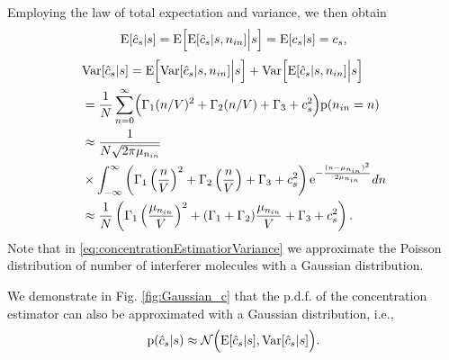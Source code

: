 \documentclass[twocolumn]{IEEEtran}
\newcommand{\p}{\mathrm{p}}
\newcommand{\E}{\mathrm{E}}
\newcommand{\e}{\mathrm{e}}
\newcommand{\Var}{\mathrm{Var}}
\begin{document}
Employing the law of total expectation and variance, we then obtain
\begin{align}
\E[\hat{c}_s|s] = \E\Bigl[\E[\hat{c}_s|s, n_{in}]\Big|s\Bigr] = \E[c_s|s] = c_s,
\end{align}
\begin{align} \label{eq:concentrationEstimatiorVariance}
&\Var[\hat{c}_s|s] = \E\Bigl[\Var[\hat{c}_s|s, n_{in}]\Big|s\Bigr] + \Var\Bigl[\E[\hat{c}_s|s, n_{in}]\Big|s\Bigr] \\ \nonumber
&= \frac{1}{N} \sum_{n=0}^\infty \Bigl(\Gamma_1 (n/V)^2 + \Gamma_2 (n/V) + \Gamma_3 + c_s^2 \Bigr) \p(n_{in} = n) \\ \nonumber
&\approx  \frac{1}{N \sqrt{2 \pi \mu_{n_{in}}}}  \\ \nonumber
&\times \int_{-\infty}^\infty \left(\Gamma_1 \left(\frac{n}{V}\right)^2+ \Gamma_2 \left(\frac{n}{V}\right) + \Gamma_3 + c_s^2\right) \e^{ -\frac{(n-\mu_{n_{in}})^2}{2\mu_{n_{in}}}} dn\\ \nonumber
&\approx \frac{1}{N} \left(\Gamma_1 \left(\frac{\mu_{n_{in}}}{V}\right)^2 + (\Gamma_1 + \Gamma_2) \frac{\mu_{n_{in}}}{V} + \Gamma_3 + c_s^2 \right).
\end{align}
Note that in \eqref{eq:concentrationEstimatiorVariance} we approximate the Poisson distribution of number of interferer molecules with a Gaussian distribution. 

We demonstrate in Fig. \ref{fig:Gaussian_c} that the p.d.f. of the concentration estimator can also be approximated with a Gaussian distribution, i.e.,
\begin{equation}
\p(\hat{c}_s|s) \approx \mathcal{N}\Bigl(\E[\hat{c}_s|s] , \Var[\hat{c}_s|s] \Bigr). \label{eq:DRUBTpdf} 
\end{equation}
\end{document}
